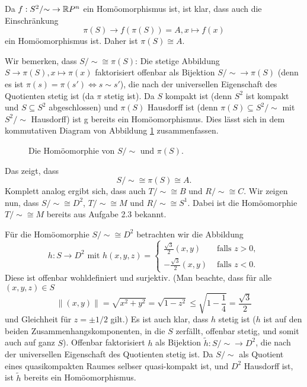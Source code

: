 \documentclass[a4paper,10pt]{article}
\begin{document}
Da $f : S^2/{\sim} \to \mathbb{R} P^n$ ein Homöomorphismus ist, ist klar, dass auch die Einschränkung
\[
 \pi(S) \to f(\pi(S)) = A, x \mapsto f(x)
\]
ein Homöomorphismus ist. Daher ist $\pi(S) \cong A$.

Wir bemerken, dass $S/{\sim} \cong \pi(S)$: Die stetige Abbildung $S \to \pi(S), x \mapsto \pi(x)$ faktorisiert offenbar als Bijektion $S/{\sim} \to \pi(S)$ (denn es ist $\pi(s) = \pi(s') \Leftrightarrow s \sim s'$), die nach der universellen Eigenschaft des Quotienten stetig ist (da $\pi$ stetig ist). Da $S$ kompakt ist (denn $S^2$ ist kompakt und $S \subseteq S^2$ abgeschlossen) und $\pi(S)$ Hausdorff ist (denn $\pi(S) \subseteq S^2/{\sim}$ mit $S^2/{\sim}$ Hausdorff) ist g bereits ein Homöomorphismus. Dies lässt sich in dem kommutativen Diagram von Abbildung \ref{fig: S/sim pi(S)} zusammenfassen.
\begin{figure}\centering
 \caption{Die Homöomorphie von $S/{\sim}$ und $\pi(S)$.}
 \label{fig: S/sim pi(S)}
\end{figure}

Das zeigt, dass
\[
 S/{\sim} \cong \pi(S) \cong A.
\]
Komplett analog ergibt sich, dass auch $T/{\sim} \cong B$ und $R/{\sim} \cong C$. Wir zeigen nun, dass $S/{\sim} \cong D^2$, $T/{\sim} \cong M$ und $R/{\sim} \cong S^1$. Dabei ist die Homöomorphie $T/{\sim} \cong M$ bereits aus Aufgabe 2.3 bekannt.

Für die Homöomorphie $S/{\sim} \cong D^2$ betrachten wir die Abbildung
\[
 h : S \to D^2 \text{ mit }
 h(x,y,z) =
 \begin{cases}
   \frac{\sqrt{3}}{2}(x,y) & \text{ falls } z > 0, \\
  -\frac{\sqrt{3}}{2}(x,y) & \text{ falls } z < 0.
 \end{cases}
\]
Diese ist offenbar wohldefiniert und surjektiv. (Man beachte, dass für alle $(x,y,z) \in S$
\[
 \|(x,y)\| = \sqrt{x^2+y^2} = \sqrt{1-z^2} \leq \sqrt{1-\frac{1}{4}} = \frac{\sqrt{3}}{2}
\]
und Gleichheit für $z = \pm 1/2$ gilt.) Es ist auch klar, dass $h$ stetig ist ($h$ ist auf den beiden Zusammenhangskomponenten, in die $S$ zerfällt, offenbar stetig, und somit auch auf ganz $S$). Offenbar faktorisiert $h$ als Bijektion $\tilde{h} : S/{\sim} \to D^2$, die nach der universellen Eigenschaft des Quotienten stetig ist. Da $S/{\sim}$ als Quotient eines quasikompakten Raumes selbser quasi-kompakt ist, und $D^2$ Hausdorff ist, ist $\tilde{h}$ bereits ein Homöomorphismus.
\end{document}
